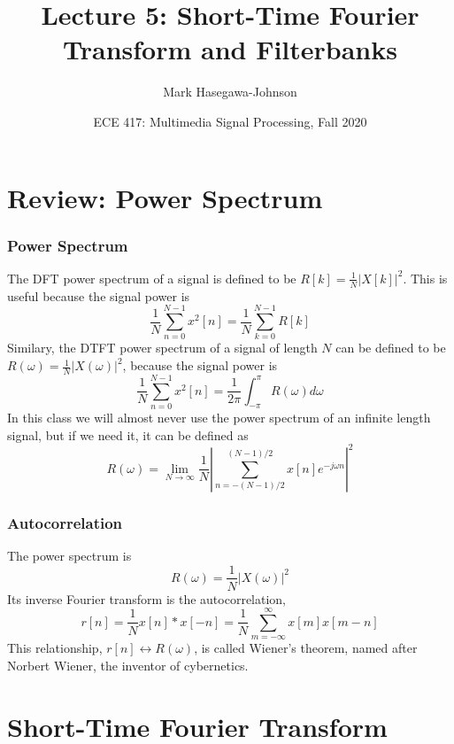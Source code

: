\documentclass{beamer}
\title{Lecture 5: Short-Time Fourier Transform and Filterbanks}
\author{Mark Hasegawa-Johnson}
\date{ECE 417: Multimedia Signal Processing, Fall 2020}
\begin{document}
\begin{frame}
  \maketitle
\end{frame}

\begin{frame}
  \tableofcontents
\end{frame}

\section[Review]{Review: Power Spectrum}
\setcounter{subsection}{1}

\begin{frame}
  \frametitle{Power Spectrum}

  The DFT power spectrum of a signal is defined to be $R[k]=\frac{1}{N}|X[k]|^2$.  This is
  useful because the signal power is
  \[
  \frac{1}{N}\sum_{n=0}^{N-1}x^2[n] = \frac{1}{N} \sum_{k=0}^{N-1}R[k]
  \]  
  Similary, the DTFT power spectrum of a signal of length $N$ can be defined to be
  $R(\omega)=\frac{1}{N}|X(\omega)|^2$, because the signal power is
  \[
  \frac{1}{N}\sum_{n=0}^{N-1}x^2[n] = \frac{1}{2\pi}\int_{-\pi}^{\pi}R(\omega)d\omega
  \]
  In this class we will almost never use the power spectrum of an
  infinite length signal, but if we need it, it can be defined as
  \[
  R(\omega) = \lim_{N\rightarrow\infty}\frac{1}{N}\left|\sum_{n=-(N-1)/2}^{(N-1)/2} x[n]e^{-j\omega n}\right|^2
  \]
\end{frame}

\begin{frame}
  \frametitle{Autocorrelation}
  The power spectrum is
  \[
  R(\omega)=\frac{1}{N}|X(\omega)|^2
  \]
  Its inverse Fourier transform is the autocorrelation,
  \[
  r[n] = \frac{1}{N}x[n]\ast x[-n]  = \frac{1}{N}\sum_{m=-\infty}^\infty  x[m] x[m-n]
  \]
  This relationship, $r[n]\leftrightarrow R(\omega)$, is called
  Wiener's theorem, named after Norbert Wiener, the inventor of
  cybernetics.
\end{frame}

\section[STFT]{Short-Time Fourier Transform}
\setcounter{subsection}{1}
\end{document}
